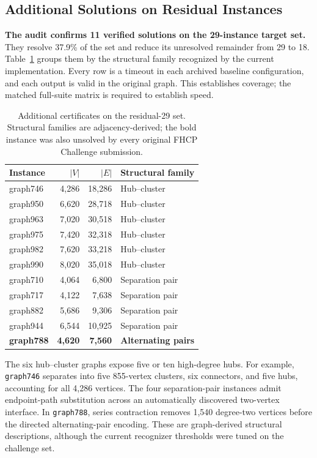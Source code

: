 \documentclass[sigconf,anonymous]{aamas}
\begin{document}
\subsection{Additional Solutions on Residual Instances}
\label{sec:results}

\textbf{The audit confirms 11 verified solutions on the 29-instance
target set.} They resolve 37.9\% of the set and reduce its unresolved
remainder from 29 to 18. Table~\ref{tab:certificates} groups them by the
structural family recognized by the current implementation. Every row
is a timeout in each archived baseline configuration, and each output
is valid in the original graph. This establishes coverage; the matched
full-suite matrix is required to establish speed.

\begin{table}[t]
  \caption{Additional certificates on the residual-29 set. Structural
  families are adjacency-derived; the bold instance was also unsolved
  by every original FHCP Challenge submission.}
  \label{tab:certificates}
  \centering
  \begin{tabular}{lrrl}\toprule
    Instance & $|V|$ & $|E|$ & Structural family\\ \midrule
    graph746 & 4,286 & 18,286 & Hub--cluster\\
    graph950 & 6,620 & 28,718 & Hub--cluster\\
    graph963 & 7,020 & 30,518 & Hub--cluster\\
    graph975 & 7,420 & 32,318 & Hub--cluster\\
    graph982 & 7,620 & 33,218 & Hub--cluster\\
    graph990 & 8,020 & 35,018 & Hub--cluster\\ \midrule
    graph710 & 4,064 & 6,800 & Separation pair\\
    graph717 & 4,122 & 7,638 & Separation pair\\
    graph882 & 5,686 & 9,306 & Separation pair\\
    graph944 & 6,544 & 10,925 & Separation pair\\ \midrule
    \textbf{graph788} & \textbf{4,620} & \textbf{7,560}
      & \textbf{Alternating pairs}\\
    \bottomrule
  \end{tabular}
\end{table}

The six hub--cluster graphs expose five or ten high-degree hubs. For
example, \texttt{graph746} separates into five 855-vertex clusters, six
connectors, and five hubs, accounting for all 4,286 vertices. The four
separation-pair instances admit endpoint-path substitution across an
automatically discovered two-vertex interface. In \texttt{graph788},
series contraction removes 1,540 degree-two vertices before the
directed alternating-pair encoding. These are graph-derived structural
descriptions, although the current recognizer thresholds were tuned on
the challenge set.
\end{document}
